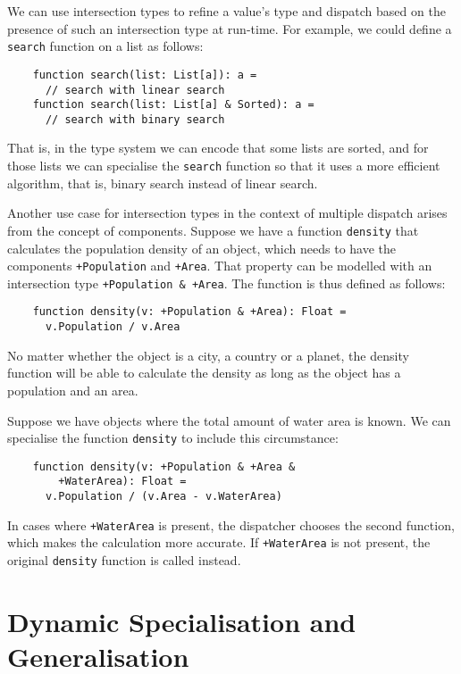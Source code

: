 We can use intersection types to refine a value's type and dispatch based on the presence of such an intersection type at run-time. For example, we could define a \texttt{search} function on a list as follows:
\begin{lstlisting}
    function search(list: List[a]): a =
      // search with linear search
    function search(list: List[a] & Sorted): a =
      // search with binary search
\end{lstlisting}

\noindent That is, in the type system we can encode that some lists are sorted, and for those lists we can specialise the \texttt{search} function so that it uses a more efficient algorithm, that is, binary search instead of linear search.

\medskip

\noindent Another use case for intersection types in the context of multiple dispatch arises from the concept of components. Suppose we have a function \texttt{density} that calculates the population density of an object, which needs to have the components \texttt{+Population} and \texttt{+Area}. That property can be modelled with an intersection type \texttt{+Population \& +Area}. The function is thus defined as follows:
\begin{lstlisting}
    function density(v: +Population & +Area): Float = 
      v.Population / v.Area
\end{lstlisting}

\noindent No matter whether the object is a city, a country or a planet, the density function will be able to calculate the density as long as the object has a population and an area.

Suppose we have objects where the total amount of water area is known. We can specialise the function \texttt{density} to include this circumstance:
\begin{lstlisting}
    function density(v: +Population & +Area & 
        +WaterArea): Float =
      v.Population / (v.Area - v.WaterArea)
\end{lstlisting}

\noindent In cases where \texttt{+WaterArea} is present, the dispatcher chooses the second function, which makes the calculation more accurate. If \texttt{+WaterArea} is not present, the original \texttt{density} function is called instead.



\section{Dynamic Specialisation and Generalisation}

